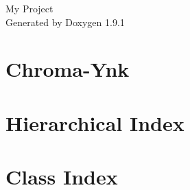 \let\mypdfximage\pdfximage\def\pdfximage{\immediate\mypdfximage}\documentclass[twoside]{book}
\newcommand{\+}{\discretionary{\mbox{\scriptsize$\hookleftarrow$}}{}{}}
\newcommand{\clearemptydoublepage}{%
  \newpage{\pagestyle{empty}\cleardoublepage}%
}
\begin{document}
\raggedbottom

\hypersetup{pageanchor=false,
             bookmarksnumbered=true,
             pdfencoding=unicode
            }
\begin{titlepage}
\vspace*{7cm}
\begin{center}%
{\Large My Project }\\
\vspace*{1cm}
{\large Generated by Doxygen 1.9.1}\\
\end{center}
\end{titlepage}
\clearemptydoublepage
{}
\tableofcontents
\clearemptydoublepage
{}
\hypersetup{pageanchor=true}

\chapter{Chroma-\/\+Ynk}
\label{md_README}

\chapter{Hierarchical Index}

\chapter{Class Index}

\end{document}
